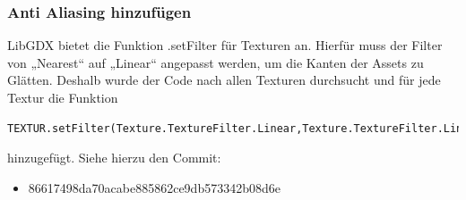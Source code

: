 \subsubsection{Anti Aliasing hinzufügen}
LibGDX bietet die Funktion .setFilter für Texturen an. Hierfür muss der Filter von „Nearest“ auf „Linear“ angepasst werden, um die Kanten der Assets zu Glätten. Deshalb wurde der Code nach allen Texturen durchsucht und für jede Textur die Funktion
\begin{lstlisting}
TEXTUR.setFilter(Texture.TextureFilter.Linear,Texture.TextureFilter.Linear);
\end{lstlisting}
hinzugefügt.
Siehe hierzu den Commit:
\begin{itemize}
\item 86617498da70acabe885862ce9db573342b08d6e
\end{itemize}

